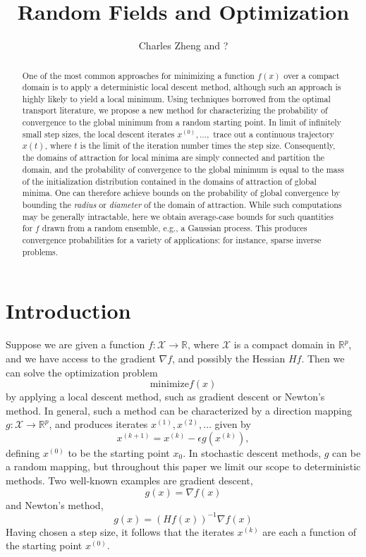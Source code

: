 \documentclass[11pt]{article}
\begin{document}
\newcommand{\tr}{\text{tr}}
\newcommand{\E}{\textbf{E}}
\newcommand{\diag}{\text{diag}}
\newcommand{\argmax}{\text{argmax}}
\newcommand{\argmin}{\text{argmin}}
\newcommand{\Cov}{\text{Cov}}
\newcommand{\Var}{\text{Var}}
\newcommand{\Vol}{\text{Vol}}
\newcommand{\HH}{\boldsymbol{H}}

\title{Random Fields and Optimization}

\author{Charles Zheng and ?}

\maketitle

\begin{abstract}
One of the most common approaches for minimizing a function $f(x)$
over a compact domain is to apply a deterministic local descent
method, although such an approach is highly likely to yield a local
minimum.  Using techniques borrowed from the optimal transport
literature, we propose a new method for characterizing the probability
of convergence to the global minimum from a random starting point.  In
limit of infinitely small step sizes, the local descent iterates
$x^{(0)}, \hdots, $ trace out a continuous trajectory $x(t)$, where
$t$ is the limit of the iteration number times the step size.
Consequently, the domains of attraction for local minima are simply
connected and partition the domain, and the probability of convergence
to the global minimum is equal to the mass of the initialization
distribution contained in the domains of attraction of global minima.
One can therefore achieve bounds on the probability of global
convergence by bounding the \emph{radius} or \emph{diameter} of the
domain of attraction.  While such computations may be generally
intractable, here we obtain average-case bounds for such quantities
for $f$ drawn from a random ensemble, e.g., a Gaussian process.  This
produces convergence probabilities for a variety of applications: for
instance, sparse inverse problems.
\end{abstract}

\section{Introduction}
Suppose we are given a function $f: \mathcal{X} \to \mathbb{R}$, where $\mathcal{X}$ is a compact domain in $\mathbb{R}^p$,
and we have access to the gradient $\nabla f$, and possibly the Hessian $H f$.
Then we can solve the optimization problem
\[
\text{minimize} f(x)
\]
by applying a local descent method, such as gradient descent or
Newton's method.  In general, such a method can be characterized by a
direction mapping $g: \mathcal{X} \to \mathbb{R}^p$, and produces
iterates $x^{(1)}, x^{(2)},\hdots$ given by
\[x^{(k+1)} = x^{(k)} - \epsilon g(x^{(k)}),\]
defining $x^{(0)}$ to be the starting point $x_0$.  In stochastic
descent methods, $g$ can be a random mapping, but throughout this
paper we limit our scope to deterministic methods.  Two well-known
examples are gradient descent,
\[
g(x) = \nabla f(x)
\]
and Newton's method,
\[
g(x) = (H f(x))^{-1} \nabla f(x)
\]
Having chosen a step size, it follows that the iterates $x^{(k)}$ are
each a function of the starting point $x^{(0)}$.
\end{document}
